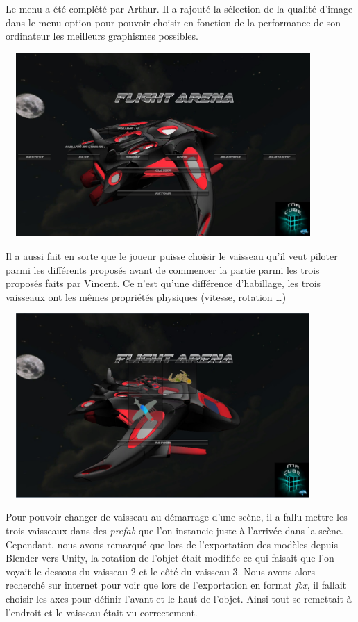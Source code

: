 \documentclass[10pt, titlepage]{report}
\begin{document}
Le menu a été complété par Arthur. Il a rajouté la sélection de la qualité d'image dans le menu option pour pouvoir choisir en fonction de la performance de son ordinateur les meilleurs graphismes possibles.\\

\begin{center}
\includegraphics[height=7cm, width=12cm]{menu_option.jpg}
\end{center}

Il a aussi fait en sorte que le joueur puisse choisir le vaisseau qu'il veut piloter parmi les différents proposés avant de commencer la partie parmi les trois proposés faits par Vincent. Ce n'est qu'une différence d'habillage, les trois vaisseaux ont les mêmes propriétés physiques (vitesse, rotation \dots )\\

\begin{center}
\includegraphics[height=7cm, width=12cm]{menu_selection.jpg}
\end{center}

Pour pouvoir changer de vaisseau au démarrage d'une scène, il a fallu mettre les trois vaisseaux dans des \textit{prefab} que l'on instancie juste à l'arrivée dans la scène. Cependant, nous avons remarqué que lors de l'exportation des modèles depuis Blender vers Unity, la rotation de l'objet était modifiée ce qui faisait que l'on voyait le dessous du vaisseau 2 et le côté du vaisseau 3. Nous avons alors recherché sur internet pour voir que lors de l'exportation en format \textit{fbx}, il fallait choisir les axes pour définir l'avant et le haut de l'objet. Ainsi tout se remettait à l'endroit et le vaisseau était vu correctement.
\end{document}
